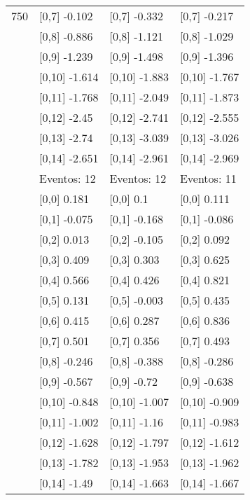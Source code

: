 \begin{table}
\begin{tabular}[t]{llll}
750 & {}[0,7] -0.102 & {}[0,7] -0.332 & {}[0,7] -0.217\\
\addlinespace
 & {}[0,8] -0.886 & {}[0,8] -1.121 & {}[0,8] -1.029\\
 & {}[0,9] -1.239 & {}[0,9] -1.498 & {}[0,9] -1.396\\
 & {}[0,10] -1.614 & {}[0,10] -1.883 & {}[0,10] -1.767\\
 & {}[0,11] -1.768 & {}[0,11] -2.049 & {}[0,11] -1.873\\
 & {}[0,12] -2.45 & {}[0,12] -2.741 & {}[0,12] -2.555\\
\addlinespace
 & {}[0,13] -2.74 & {}[0,13] -3.039 & {}[0,13] -3.026\\
 & {}[0,14] -2.651 & {}[0,14] -2.961 & {}[0,14] -2.969\\
 & Eventos:  12 & Eventos:  12 & Eventos:  11\\
 & {}[0,0] 0.181 & {}[0,0] 0.1 & {}[0,0] 0.111\\
 & {}[0,1] -0.075 & {}[0,1] -0.168 & {}[0,1] -0.086\\
\addlinespace
 & {}[0,2] 0.013 & {}[0,2] -0.105 & {}[0,2] 0.092\\
 & {}[0,3] 0.409 & {}[0,3] 0.303 & {}[0,3] 0.625\\
 & {}[0,4] 0.566 & {}[0,4] 0.426 & {}[0,4] 0.821\\
 & {}[0,5] 0.131 & {}[0,5] -0.003 & {}[0,5] 0.435\\
 & {}[0,6] 0.415 & {}[0,6] 0.287 & {}[0,6] 0.836\\
\addlinespace
1000 & {}[0,7] 0.501 & {}[0,7] 0.356 & {}[0,7] 0.493\\
 & {}[0,8] -0.246 & {}[0,8] -0.388 & {}[0,8] -0.286\\
 & {}[0,9] -0.567 & {}[0,9] -0.72 & {}[0,9] -0.638\\
 & {}[0,10] -0.848 & {}[0,10] -1.007 & {}[0,10] -0.909\\
 & {}[0,11] -1.002 & {}[0,11] -1.16 & {}[0,11] -0.983\\
\addlinespace
 & {}[0,12] -1.628 & {}[0,12] -1.797 & {}[0,12] -1.612\\
 & {}[0,13] -1.782 & {}[0,13] -1.953 & {}[0,13] -1.962\\
 & {}[0,14] -1.49 & {}[0,14] -1.663 & {}[0,14] -1.667\\
\bottomrule
\end{tabular}
\end{table}
